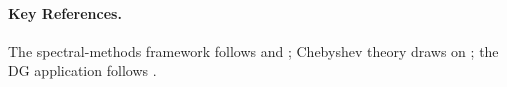 







\paragraph{Key References.}
The spectral-methods framework follows \cite{Hesthaven2007} and
\cite{Kopriva2009}; Chebyshev theory draws on \cite{Trefethen2000};
the DG application follows \cite{HesthavenWarburton2008}.
